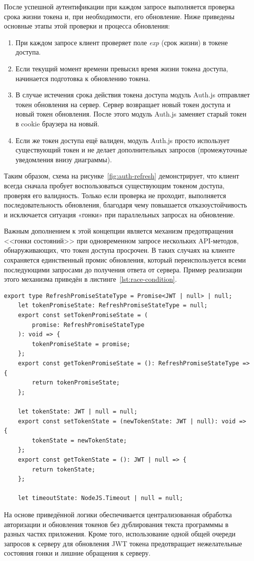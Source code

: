 После успешной аутентификации при каждом запросе выполняется проверка срока жизни токена и, при необходимости, его обновление.  Ниже приведены основные этапы этой проверки и процесса обновления:
\begin{enumerate}
    \item При каждом запросе клиент проверяет поле \textit{exp} (срок жизни) в токене доступа.
    \item Если текущий момент времени превысил время жизни токена доступа, начинается подготовка к обновлению токена.
    \item В случае истечения срока действия токена доступа модуль Auth.js отправляет токен обновления на сервер. Сервер возвращает новый токен доступа и новый токен обновления. После этого модуль Auth.js заменяет старый токен в cookie браузера на новый.
    \item Если же токен доступа ещё валиден, модуль Auth.js просто использует существующий токен и не делает дополнительных запросов (промежуточные уведомления внизу диаграммы).
\end{enumerate}

Таким образом, схема на рисунке~\ref{fig:auth-refresh} демонстрирует, что клиент всегда сначала пробует воспользоваться существующим токеном доступа, проверяя его валидность. Только если проверка не проходит, выполняется последовательность обновления, благодаря чему повышается отказоустойчивость и исключается ситуация «гонки» при параллельных запросах на обновление.

Важным дополнением к этой концепции является механизм предотвращения <<гонки состояний>> при одновременном запросе нескольких API-методов, обнаруживающих, что токен доступа просрочен. В таких случаях на клиенте сохраняется единственный промис обновления, который переиспользуется всеми последующими запросами до получения ответа от сервера. Пример реализации этого механизма приведён в листинге~\ref{lst:race-condition}.

\begin{lstlisting}[caption={Механизм предотвращения гонки состояний при рефреше токена}, label={lst:race-condition}]
	export type RefreshPromiseStateType = Promise<JWT | null> | null;
	let tokenPromiseState: RefreshPromiseStateType = null;
	export const setTokenPromiseState = (
		promise: RefreshPromiseStateType
	): void => {
		tokenPromiseState = promise;
	};
	export const getTokenPromiseState = (): RefreshPromiseStateType => {
		return tokenPromiseState;
	};

	let tokenState: JWT | null = null;
	export const setTokenState = (newTokenState: JWT | null): void => {
		tokenState = newTokenState;
	};
	export const getTokenState = (): JWT | null => {
		return tokenState;
	};

	let timeoutState: NodeJS.Timeout | null = null;
\end{lstlisting}

На основе приведённой логики обеспечивается централизованная обработка авторизации и обновления токенов без дублирования текста программмы в разных частях приложения. Кроме того, использование одной общей очереди запросов к серверу для обновления JWT токена предотвращает нежелательные состояния гонки и лишние обращения к серверу.
